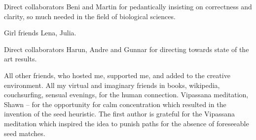 Direct collaborators Beni and Martin for pedantically insisting on correctness
and clarity, so much needed in the field of biological sciences.

Girl friends Lena, Julia.

Direct collaborators Harun, Andre and Gunnar for directing towards state of the art results.

All other friends, who hosted me, supported
me, and added to the creative environment.
All my virtual and imaginary friends in books, wikipedia, couchsurfing, sensual
evenings, for the human connection. 
Vipassana meditation, Shawn -- for the opportunity for calm concentration which
resulted in the invention of the seed heuristic. The first author is grateful
for the Vipassana meditation which inspired the idea to punish paths for the
absence of foreseeable seed matches.

\endgroup

